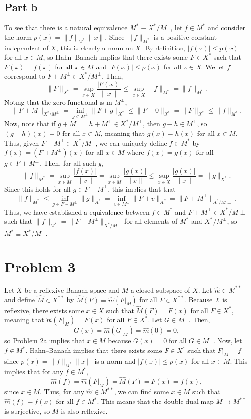 \documentclass{article}
\begin{document}
\subsection{Part b}
To see that there is a natural equivalence $M^*\equiv X^*/M^\perp$, let $f\in M^*$ and consider the norm $p(x)=\|f\|_{M^*}\|x\|$. Since $\|f\|_{M^*}$ is a positive constant independent of $X$, this is clearly a norm on $X$. By definition, $|f(x)|\leq p(x)$ for all $x\in M$, so Hahn--Banach implies that there exists some $F\in X^*$ such that $F(x)=f(x)$ for all $x\in M$ and $|F(x)|\leq p(x)$ for all $x\in X$. We let $f$ correspond to $F+M^\perp\in X^*/M^\perp$. Then,
\[
\|F\|_{X^*}=\sup_{x\in X}\frac{|F(x)|}{\|x\|}\leq\sup_{x\in X}\|f\|_{M^*}=\|f\|_{M^*}.
\]
Noting that the zero functional is in $M^\perp$, 
\[
\|F+M\|_{X^*/M^\perp}=\inf_{g\in M^\perp}\|F+g\|_{X^*}\leq \|F+0\|_{X^*}=\|F\|_{X^*}\leq \|f\|_{M^*}.
\]
Now, note that if $g+M^\perp=h+M^\perp\in X^*/M^\perp$, then $g-h\in M^\perp$, so $(g-h)(x)=0$ for all $x\in M$, meaning that $g(x)=h(x)$ for all $x\in M$. Thus, given  $F+M^\perp\in X^*/M^\perp$, we can uniquely define $f\in M^*$ by $f(x)=(F+M^\perp)(x)$ for all $x\in M$ where $f(x)=g(x)$ for all $g\in F+M^\perp$. Then, for all such $g$,
\[
\|f\|_{M^*}=\sup_{x\in M}\frac{|f(x)|}{\|x\|}=\sup_{x\in M}\frac{|g(x)|}{\|x\|}\leq\sup_{x\in X}\frac{|g(x)|}{\|x\|}=\|g\|_{X^*}.
\]
Since this holds for all $g\in F+M^\perp$, this implies that that 
\[
\|f\|_{M^*}\leq\inf_{g\in F+M^\perp}\|g\|_{X^*}=\inf_{v\in M^\perp}\|F+v\|_{X^*}=\|F+M^\perp\|_{X^*/M\perp}.
\]
Thus, we have established a equivalence between $f\in M^*$ and $F+M^\perp\in X^*/M\perp$ such that $\|f\|_{M^*}=\|F+M^\perp\|_{X^*/M^\perp}$ for all elements of $M^*$ and $X^*/M^\perp$, so $M^*\equiv X^*/M^\perp$. 

\section{Problem 3}
Let $X$ be a reflexive Banach space and $M$ a closed subspace of $X$. Let $\hat m\in M^{**}$ and define $\hat M\in X^{**}$ by $\hat M(F)=\hat m\left(F\big|_M\right)$ for all $F\in X^{**}$. Because $X$ is reflexive, there exists some $x\in X$ such that $\hat M(F)=F(x)$ for all $F\in X^*$, meaning that $\hat m\left(F\big|_M\right)=F(x)$ for all $F\in X^*$. Let $G\in M^\perp$. Then,
\[
G(x)=\hat m\left(G\big|_M\right)=\hat m(0)=0,
\]
so Problem 2a implies that $x\in M$ because $G(x)=0$ for all $G\in M^\perp$. Now, let $f\in M^*$. Hahn--Banach implies that there exists some $F\in X^*$ such that $F\big|_M=f$ since $p(x)=\|f\|_{M^*}\|x\|$ is a norm and $|f(x)|\leq p(x)$ for all $x\in M$. This implies that for any $f\in M^*$,
\[
\hat m(f)=\hat m\left(F\big|_M\right)=\hat M(F)=F(x)=f(x),
\]
since $x\in M$. Thus, for any $\hat m\in M^{**}$, we can find some $x\in M$ such that $\hat m(f)=f(x)$ for all $f\in M^*$. This means that the double dual map $M\to M^{**}$ is surjective, so $M$ is also reflexive.
\end{document}
